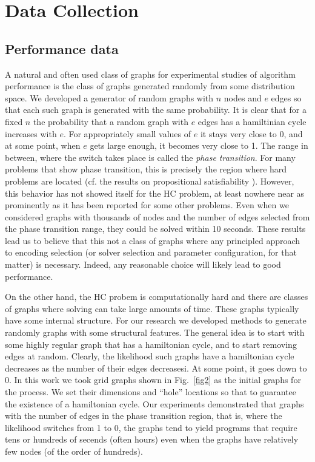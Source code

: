 \documentclass{new_tlp}
\begin{document}
\section{Data Collection}
\subsection{Performance data} \label{performancedata}

A natural and often used class of graphs for experimental studies of algorithm 
performance is the class of graphs generated randomly from some distribution 
space. We developed a generator 
of random graphs with $n$ nodes and $e$ edges so that each such graph is 
generated with the same probability. It is clear that for a fixed $n$ the 
probability that a random graph with $e$ edges has a hamiltinian cycle 
increases with $e$. For appropriately small values of $e$ it stays very 
close to 0, and at some point, when $e$ gets large enough, it becomes very 
close to 1. The range in between, where the switch takes place is called
the \emph{phase transition}. For many problems that show phase transition,
this is precisely the region where hard problems are located (cf. the
results on propositional satisfiability \cite{SelmanML96}). However, this behavior
has not showed itself for the HC problem, at least nowhere near as prominently 
as it has been reported for some other problems. Even when we considered graphs 
with thousands of nodes and the number of edges selected from the phase 
transition range, they could be solved within 10 seconds. These results lead
us to believe that this not a class of graphs where any principled approach
to encoding selection (or solver selection and parameter configuration, for 
that matter) is necessary. Indeed, any reasonable choice will likely lead to 
good performance.

On the other hand, the HC probem is computationally hard and there are classes 
of graphs where solving can take large amounts of time. These graphs typically 
have some internal structure. For our research we developed methods to generate 
randomly graphs with some structural features. The general idea is to start 
with some highly regular graph that has a hamiltonian cycle, and to start
removing edges at random. Clearly, the likelihood such graphs have a
hamiltonian cycle decreases as the number of their edges decreasesi. At some
point, it goes down to 0. In this work we took grid graphs shown in 
Fig.~\ref{fig2} as the initial graphs for the process. We set their dimensions
and ``hole'' locations so that to guarantee the existence of a hamiltonian 
cycle. Our experiments demonstrated that graphs with the number of edges 
in the phase transition region, that is, where the likelihood switches from 
1 to 0, the graphs tend to yield programs that require tens or hundreds 
of secends (often hours) even when the graphs have relatively few nodes 
(of the order of hundreds).
\end{document}
